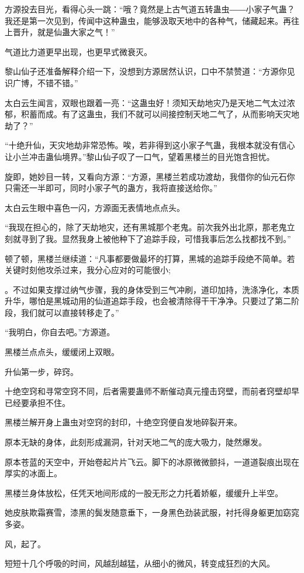 \begin{this_body}
方源投去目光，看得心头一跳：“哦？竟然是上古气道五转蛊虫――小家子气蛊？我还是第一次见到，传闻中这种蛊虫，能够汲取天地中的各种气，储藏起来。再往上晋升，就是仙蛊大家之气！”

气道比力道更早出现，也更早式微衰灭。

黎山仙子还准备解释介绍一下，没想到方源居然认识，口中不禁赞道：“方源你见识广博，不错不错。”

太白云生闻言，双眼也跟着一亮：“这蛊虫好！须知天劫地灾乃是天地二气太过浓郁，积蓄而成。有了这蛊虫，我们不就可以间接控制天地二气了，从而影响天灾地劫了？”

“十绝升仙，天灾地劫非常恐怖。唉，若非得到这小家子气蛊，我根本就没有信心让小兰冲击蛊仙境界。”黎山仙子叹了一口气，望着黑楼兰的目光饱含担忧。

旋即，她妙目一转，又看向方源：“方源，黑楼兰若成功渡劫，我借你的仙元石你只需还一半即可，同时小家子气的蛊方，我将直接送给你。”

太白云生眼中喜色一闪，方源面无表情地点点头。

“我现在担心的，除了天劫地灾，还有黑城那个老鬼。前次我外出北原，那老鬼立刻就寻到了我。显然我身上被他种下了追踪手段，可惜我事后怎么找都找不到。”

顿了顿，黑楼兰继续道：“凡事都要做最坏的打算，黑城的追踪手段绝不简单。若关键时刻他攻杀过来，我分心应对的可能很小;

。不过如果支撑过纳气步骤，我的身体受到三气冲刷，道印加持，洗涤净化，本质升华，哪怕是黑城动用的仙道追踪手段，也会被清除得干干净净。只要过了第二阶段，我们就可以直接转移走了。”

“我明白，你自去吧。”方源道。

黑楼兰点点头，缓缓闭上双眼。

升仙第一步，碎窍。

十绝空窍和寻常空窍不同，后者需要蛊师不断催动真元撞击窍壁，而前者窍壁却早已经要承担不住。

黑楼兰解开身上蛊虫对空窍的封印，十绝空窍便自发地碎裂开来。

原本无缺的身体，此刻形成漏洞，针对天地二气的庞大吸力，陡然爆发。

原本苍蓝的天空中，开始卷起片片飞云。脚下的冰原微微颤抖，一道道裂痕出现在厚实的冰面上。

黑楼兰身体放松，任凭天地间形成的一股无形之力托着娇躯，缓缓升上半空。

她皮肤欺霜赛雪，漆黑的鬓发随意垂下，一身黑色劲装武服，衬托得身躯更加窈窕多姿。

风，起了。

短短十几个呼吸的时间，风越刮越猛，从细小的微风，转变成狂烈的大风。


\end{this_body}
